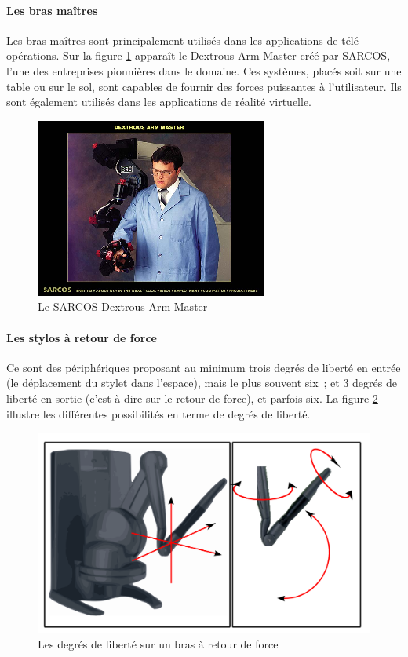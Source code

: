 \documentclass[
]{book}
\begin{document}
\hypertarget{les-bras-mauxeetres}{%
\paragraph{Les bras maîtres}\label{les-bras-mauxeetres}}

Les bras maîtres sont principalement utilisés dans les applications de
télé-opérations. Sur la figure \ref{fig:dextros}
apparaît le Dextrous Arm Master créé par SARCOS, l'une des entreprises
pionnières dans le domaine. Ces systèmes, placés soit sur une table ou sur le
sol, sont capables de fournir des forces puissantes à l'utilisateur. Ils sont
également utilisés dans les applications de réalité virtuelle.

\begin{figure}
\centering
\includegraphics{img/dextroslarge.png}
\caption{\label{fig:dextros}Le SARCOS Dextrous Arm Master}
\end{figure}

\hypertarget{les-stylos-uxe0-retour-de-force}{%
\paragraph{Les stylos à retour de force}\label{les-stylos-uxe0-retour-de-force}}

Ce sont des périphériques proposant au minimum trois degrés de liberté en
entrée (le déplacement du stylet dans l'espace), mais le plus souvent six~; et
3 degrés de liberté en sortie (c'est à dire sur le retour de force), et
parfois six. La figure \ref{fig:degres} illustre
les différentes possibilités en terme de degrés de liberté.

\begin{figure}
\centering
\includegraphics{img/DoF.png}
\caption{\label{fig:degres}Les degrés de liberté sur un bras à retour de force}
\end{figure}
\end{document}
